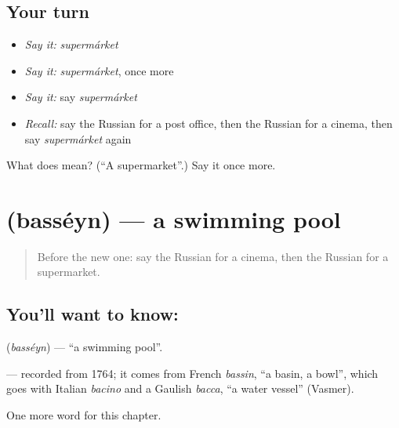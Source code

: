 \subsection*{Your turn}
\begin{itemize}
\raggedright
  \item \emph{Say it:} \emph{supermárket}
  \item \emph{Say it:} \emph{supermárket}, once more
  \item \emph{Say it:} say \emph{supermárket}
  \item \emph{Recall:} say the Russian for a post office, then the Russian for a cinema, then say \emph{supermárket} again
\end{itemize}

\begin{tcolorbox}[breakable,colback=teal!4,colframe=teal!35!black,title={Before you move on}]
What does  mean? (\textquotedblleft{}A supermarket\textquotedblright{}.) Say it once more.
\end{tcolorbox}
\section[\texorpdfstring{\ru{бассейн} (basséyn)}{бассейн (basséyn)}]{ (basséyn) — a swimming pool}

\label{lesson:RU-C88-swimming-pool}



\begin{quote}
Before the new one: say the Russian for a cinema, then the Russian for a supermarket.
\end{quote}

\subsection*{You'll want to know: }
\textbf{} (\emph{basséyn}) — \textquotedblleft{}a swimming pool\textquotedblright{}.

\begin{cousinweb}
\textbf{} — recorded from 1764; it comes from French \emph{bassin}, \textquotedblleft{}a basin, a bowl\textquotedblright{}, which goes with Italian \emph{bacino} and a Gaulish \emph{bacca}, \textquotedblleft{}a water vessel\textquotedblright{} (Vasmer).
\end{cousinweb}

\begin{grammarlens}[title={What you've built}]
One more word for this chapter.
\end{grammarlens}

